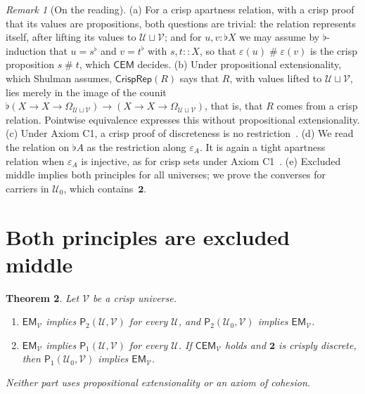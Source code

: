 \documentclass[11pt]{amsart}
\newtheorem{theorem}{Theorem}[section]
\theoremstyle{definition}
\theoremstyle{remark}
\newtheorem{remark}[theorem]{Remark}
\newcommand{\U}{\mathcal U}
\newcommand{\V}{\mathcal V}
\newcommand{\Uz}{\mathcal U_0}
\newcommand{\B}{\mathbf 2}
\newcommand{\Om}{\Omega}
\newcommand{\crisp}{\mathrel{::}}
\newcommand{\cu}{\varepsilon}
\newcommand{\fl}[1]{{#1}^{\flat}}
\newcommand{\EM}{\mathsf{EM}}
\newcommand{\CEM}{\mathsf{CEM}}
\newcommand{\CrispRep}{\mathsf{CrispRep}}
\newcommand{\Pone}{\mathsf P_1}
\newcommand{\Ptwo}{\mathsf P_2}
\newcommand{\ap}{\mathrel{\#}}
\begin{document}
\begin{remark}[On the reading]\label{rem:reading}
(a) For a crisp apartness relation, with a crisp proof that its values are
propositions, both questions are trivial: the relation represents itself,
after lifting its values to $\U\sqcup\V$; and for $u,v:\flat X$ we may
assume by $\flat$-induction that $u=\fl s$ and $v=\fl t$ with $s,t\crisp
X$, so that $\cu(u)\ap\cu(v)$ is the crisp proposition $s\ap t$, which
$\CEM$ decides.
(b) Under propositional extensionality, which Shulman assumes,
$\CrispRep(R)$ says that $R$, with values lifted to $\U\sqcup\V$, lies
merely in the image of the counit
$\flat(X\to X\to\Om_{\U\sqcup\V})\to(X\to X\to\Om_{\U\sqcup\V})$, that
is, that $R$ comes from a crisp relation. Pointwise equivalence
expresses this without propositional extensionality.
(c) Under Axiom C1, a crisp proof of discreteness is no
restriction~\cite[Lemma~8.10]{Shulman2018}.
(d) We read the relation on $\flat A$ as the restriction along $\cu_A$.
It is again a tight apartness relation when $\cu_A$ is injective, as for
crisp sets under Axiom C1~\cite[Theorem~8.21]{Shulman2018}.
(e) Excluded middle implies both principles for all universes; we prove
the converses for carriers in $\Uz$, which contains~$\B$.
\end{remark}

\section{Both principles are excluded middle}\label{sec:em}

\begin{theorem}\label{thm:em}
Let $\V$ be a crisp universe.
\begin{enumerate}[label=(\roman*)]
\item $\EM_\V$ implies $\Ptwo(\U,\V)$ for every $\U$, and $\Ptwo(\Uz,\V)$
implies $\EM_\V$.
\item $\EM_\V$ implies $\Pone(\U,\V)$ for every $\U$. If $\CEM_\V$ holds
and $\B$ is crisply discrete, then $\Pone(\Uz,\V)$ implies $\EM_\V$.
\end{enumerate}
Neither part uses propositional extensionality or an axiom of cohesion.
\end{theorem}
\end{document}
